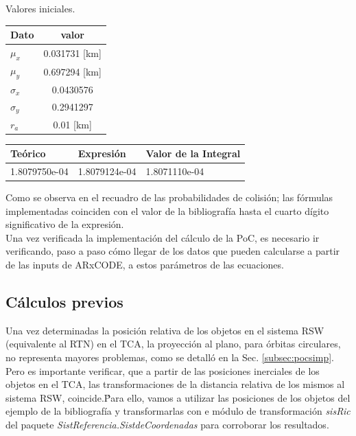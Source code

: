 \begin{minipage}[b]{0.28\textwidth}
Valores iniciales.\\

\begin{tabular}{|lc|}
\hline
 Dato & valor \\
\hline
$\mu_{x}$ & 0.031731 [km]\\
$\mu_{y}$ & 0.697294 [km]\\
$\sigma_{x}$ & 0.0430576\\
$\sigma_{y}$ & 0.2941297\\
$r_{a}$ & 0.01 [km]\\
\hline
\end{tabular}
\end{minipage}
\begin{minipage}[t]{0.7\textwidth}
\begin{mdframed}[
        linecolor=red,linewidth=2pt,%
        frametitlerule=true,%
        apptotikzsetting={\tikzset{mdfframetitlebackground/.append style={%
            shade,left color=white, right color=blue!20}}}, 
        frametitlerulecolor=blue,
        frametitlerulewidth=1pt, innertopmargin=\topskip,
        frametitle={Probabilidad de Colisi\'on},
        outerlinewidth=1.25pt
    ]
\large
\begin{tabular}{|l|l|l|}
  \hline
 Te\'orico & Expresi\'on & Valor de la Integral\\
 \hline
 1.8079750e-04 & 1.8079124e-04 & 1.8071110e-04\\
 \hline
\end{tabular} 
\end{mdframed}
\end{minipage}

Como se observa en el recuadro de las probabilidades de colisi\'on; las f\'ormulas implementadas coinciden con el valor de la bibliograf\'ia hasta el cuarto d\'igito significativo de la expresi\'on.\\

Una vez verificada la implementaci\'on del c\'alculo de la PoC, es necesario ir verificando, paso a paso c\'omo llegar de los datos que pueden calcularse a partir de las inputs de ARxCODE, a estos par\'ametros de las ecuaciones. \\

\subsection*{C\'alculos previos}

Una vez determinadas la posici\'on relativa de los objetos en el sistema RSW (equivalente al RTN) en el TCA, la proyecci\'on al plano, para \'orbitas circulares, no representa mayores problemas, como se detall\'o en la Sec. \ref{subsec:pocsimp}.\\
Pero es importante verificar, que a partir de las posiciones inerciales de los objetos en el TCA, las transformaciones de la distancia relativa de los mismos al sistema RSW, coincide.\'
Para ello, vamos a utilizar las posiciones de los objetos del ejemplo de la bibliograf\'ia y transformarlas con e m\'odulo de transformaci\'on {\it{sisRic}} del paquete {\it{SistReferencia.SistdeCoordenadas}} para corroborar los resultados.

